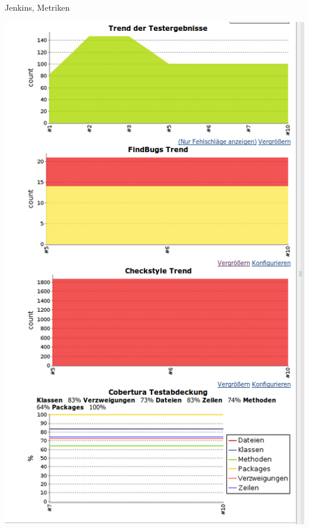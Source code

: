 \documentclass{beamer}
\begin{document}
\begin{frame}{Jenkins, Metriken}
	\begin{center}
		\includegraphics[height=.8\textheight]{jenkins-metriken.png}
	\end{center}
\end{frame}
\end{document}
